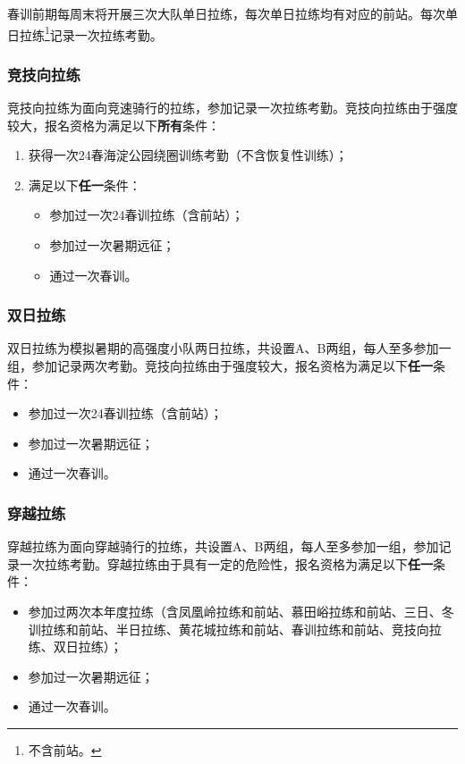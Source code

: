 \documentclass[UTF8]{ctexart}
\begin{document}
春训前期每周末将开展三次大队单日拉练，每次单日拉练均有对应的前站。每次单日拉练\footnote{不含前站。}记录一次拉练考勤。

\subsubsection{竞技向拉练}

竞技向拉练为面向竞速骑行的拉练，参加记录一次拉练考勤。竞技向拉练由于强度较大，报名资格为满足以下\textbf{所有}条件：
\begin{enumerate}[nosep,left=4em]
    \item 获得一次24春海淀公园绕圈训练考勤（不含恢复性训练）；
    \item 满足以下\textbf{任一}条件：
    \begin{itemize}[nosep,left=1em]
        \item 参加过一次24春训拉练（含前站）；
        \item 参加过一次暑期远征；
        \item 通过一次春训。
    \end{itemize}
\end{enumerate}

\subsubsection{双日拉练}

双日拉练为模拟暑期的高强度小队两日拉练，共设置A、B两组，每人至多参加一组，参加记录两次考勤。竞技向拉练由于强度较大，报名资格为满足以下\textbf{任一}条件：
\begin{itemize}[nosep,left=4em]
    \item 参加过一次24春训拉练（含前站）；
    \item 参加过一次暑期远征；
    \item 通过一次春训。
\end{itemize}

\subsubsection{穿越拉练}

穿越拉练为面向穿越骑行的拉练，共设置A、B两组，每人至多参加一组，参加记录一次拉练考勤。穿越拉练由于具有一定的危险性，报名资格为满足以下\textbf{任一}条件：
\begin{itemize}[nosep,left=4em]
    \item 参加过两次本年度拉练（含凤凰岭拉练和前站、慕田峪拉练和前站、三日、冬训拉练和前站、半日拉练、黄花城拉练和前站、春训拉练和前站、竞技向拉练、双日拉练）；
    \item 参加过一次暑期远征；
    \item 通过一次春训。
\end{itemize}
\end{document}

